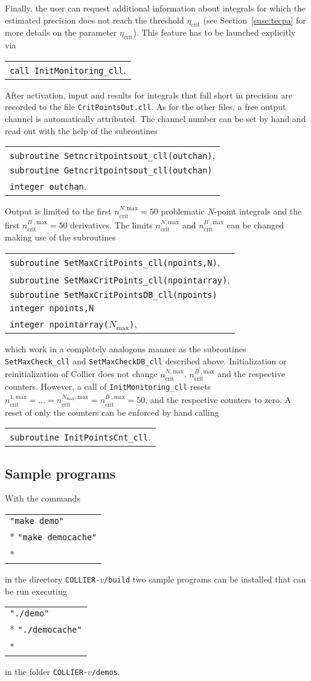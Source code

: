 \documentclass[preprint,sort&compress,12pt]{elsarticle}
\makeatletter
\def\bce{\begin{center}}
\def\ece{\end{center}}
\def\refse#1{\mbox{Section~\ref{#1}}}
\newcommand{\collier}{{\sc Collier}}
\newlength{\parwidth}\newlength{\colonewidth}%
\newcommand{\cpcsub}[1]
{%
\setlength{\parwidth}{\textwidth}\addtolength{\parwidth}{-2.1em}%
\bce
\begin{tabular}[t]{@{}p{\parwidth}@{}}
#1
\end{tabular}
\ece
}%
\makeatother
\begin{document}
  Finally, the user can request additional information about integrals
  for which the estimated precision does not reach the threshold
  $\eta_\textrm{crit}$ (see \refse{suse:tecpa} for more details on the
  parameter $\eta_\textrm{crit}$). This feature has to be launched
  explicitly via 
\cpcsub{ {\tt call InitMonitoring\_cll}\;.  }  
After activation, input and results for integrals that fall short in
precision are recorded to the file {\tt CritPointsOut.cll}. As for the
other files, a free output channel is automatically attributed.  The
channel number can be set by hand and read out with the help of the
subroutines
\cpcsub{
{\tt subroutine  Setncritpointsout\_cll(outchan)}\;,\\
{\tt subroutine  Getncritpointsout\_cll(outchan)}\\
{\tt integer outchan}\;. \\
} 
Output is limited to the first $n^{N,\textrm{max}}_\textrm{crit}=50$
problematic $N$-point integrals and the first
$n^{B^\prime,\textrm{max}}_\textrm{crit}=50$ derivatives.  The limits
$n^{N,\textrm{max}}_\textrm{crit}$ and
$n^{B^\prime,\textrm{max}}_\textrm{crit}$ can be changed making
use of the subroutines
\cpcsub{
{\tt subroutine  SetMaxCritPoints\_cll(npoints,N)}\;,\\
{\tt subroutine  SetMaxCritPoints\_cll(npointarray)}\;,\\
{\tt subroutine  SetMaxCritPointsDB\_cll(npoints)}\\
{\tt integer npoints,N} \\
{\tt integer npointarray($N_\textrm{max}$)}\;, \\
}
which work in a completely analogous manner as the subroutines
{\tt SetMaxCheck\_cll} and {\tt SetMaxCheckDB\_cll} described above.
Initialization or reinitialization of {\collier} does not change 
$n^{N,\textrm{max}}_\textrm{crit}$,
$n^{B^\prime,\textrm{max}}_\textrm{crit}$ and the respective counters.
However, a call of {\tt InitMonitoring\_cll}
resets
$n^{1,\textrm{max}}_\textrm{crit}=\ldots=n^{N_{\textrm{max}},\textrm{max}}_\textrm{crit}=n^{B^\prime,\textrm{max}}_\textrm{crit}=50$,
and the respective counters to zero. 
A reset of only the counters can be enforced by hand calling
\cpcsub{
{\tt subroutine  InitPointsCnt\_cll}\;.\\
}

\subsection{Sample programs}
\label{subsec:demo}
With the commands
\cpcsub{%
{\tt "make demo"}\\*
{\tt "make democache"}\\*
}
in the directory {\tt COLLIER-$v$/build}
two sample programs can be installed that can be run executing
\cpcsub{%
{\tt "./demo"}\\*
{\tt "./democache"}\\*
}
in the folder {\tt COLLIER-$v$/demos}.
\end{document}
